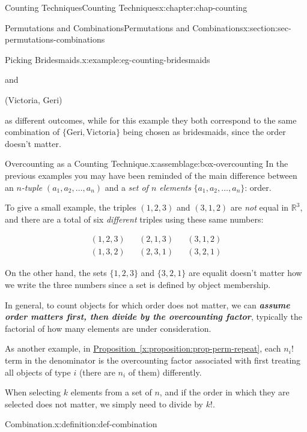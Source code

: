 \documentclass[oneside,10pt,]{book}
\newcommand{\xreffont}{\relax}
\newcommand{\alert}[1]{\textbf{\textit{#1}}}
\numberwithin{equation}{section}
\newcommand{\amp}{&}
\begin{document}
\begin{chapterptx}{Counting Techniques}{}{Counting Techniques}{}{}{x:chapter:chap-counting}
\begin{sectionptx}{Permutations and Combinations}{}{Permutations and Combinations}{}{}{x:section:sec-permutations-combinations}
\begin{example}{Picking Bridesmaids.}{x:example:eg-counting-bridesmaids}
\begin{sidebyside}{3}{0.2}{0.2}{0}
\begin{sbspanel}{0.1}%
\par
and%
\end{sbspanel}%
\begin{sbspanel}{0.25}%
\par
(Victoria, Geri)%
\end{sbspanel}%
\end{sidebyside}%
\par
as different outcomes, while for this example they both correspond to the same combination of \(\{\text{Geri}, \text{Victoria}\}\) being chosen as bridesmaids, since the order doesn't matter.%
\end{example}
\begin{assemblage}{Overcounting as a Counting Technique.}{x:assemblage:box-overcounting}%
In the previous examples you may have been reminded of the main difference between an \emph{\(n\)-tuple} \((a_1,a_2,\ldots,a_n)\) and a \emph{set of \(n\) elements} \(\{a_1,a_2,\ldots,a_n\}\): order.%
\par
To give a small example, the triples \((1,2,3)\) and \((3,1,2)\) are \emph{not} equal in \(\mathbb{R}^3\), and there are a total of six \emph{different} triples using these same numbers:%
\par
%
\begin{align*}
(1,2,3) \amp \amp (2,1,3) \amp \amp (3,1,2)\\
(1,3,2) \amp \amp (2,3,1) \amp \amp (3,2,1)
\end{align*}
%
\par
On the other hand, the sets \(\{1,2,3\}\) and \(\{3,2,1\}\) are equal\textemdash{}it doesn't matter how we write the three numbers since a set is defined by object membership.%
\par
In general, to count objects for which order does not matter, we can \alert{assume order matters first, then divide by the overcounting factor}, typically the factorial of how many elements are under consideration.%
\par
As another example, in \hyperref[x:proposition:prop-perm-repeat]{Proposition~{\xreffont\ref{x:proposition:prop-perm-repeat}}}, each \(n_i!\) term in the denominator is the overcounting factor associated with first treating all objects of type \(i\) (there are \(n_i\) of them) differently.%
\end{assemblage}
When selecting \(k\) elements from a set of \(n\), and if the order in which they are selected does not matter, we simply need to divide by \(k!\).%
\begin{definition}{Combination.}{x:definition:def-combination}%

\end{definition}
\end{sectionptx}
\end{chapterptx}
\end{document}
